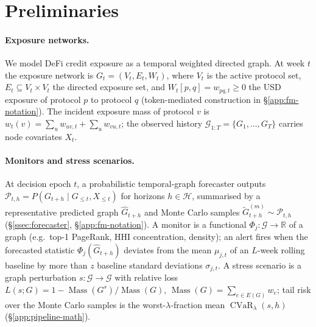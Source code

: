 \section{Preliminaries}
\label{sec:preliminaries}

\paragraph{Exposure networks.}
We model DeFi credit exposure as a temporal weighted directed
graph. At week $t$ the exposure network is $G_t=(V_t,E_t,W_t)$,
where $V_t$ is the active protocol set, $E_t\subseteq V_t\times
V_t$ the directed exposure set, and $W_t[p,q]=w_{pq,t}\geq 0$ the
USD exposure of protocol $p$ to protocol $q$ (token-mediated
construction in \S\ref{app:fm-notation}). The incident exposure
mass of protocol $v$ is
$w_t(v)=\sum_{u}w_{uv,t}+\sum_{u}w_{vu,t}$; the observed history
$\mathcal{G}_{1:T}=\{G_1,\ldots,G_T\}$ carries node covariates
$X_t$.

\paragraph{Monitors and stress scenarios.}
At decision epoch $t$, a probabilistic temporal-graph forecaster
outputs $\mathcal{P}_{t,h}=P(G_{t+h}\mid G_{\leq t},X_{\leq t})$
for horizons $h\in\mathcal{H}$, summarised by a representative
predicted graph $\widehat{G}_{t+h}$ and Monte Carlo samples
$\widetilde{G}_{t+h}^{(m)}\sim\mathcal{P}_{t,h}$
(\S\ref{ssec:forecaster}, \S\ref{app:fm-notation}). A monitor is
a functional $\Phi_j:\mathcal{G}\to\mathbb{R}$ of a graph (e.g.\
top-1 PageRank, HHI concentration, density); an alert fires when
the forecasted statistic $\Phi_j(\widehat{G}_{t+h})$ deviates
from the mean $\mu_{j,t}$ of an $L$-week rolling baseline by
more than $z$ baseline standard deviations $\sigma_{j,t}$. A stress scenario is a graph perturbation
$s:\mathcal{G}\to\mathcal{G}$ with relative loss
$L(s;G)=1-\operatorname{Mass}(G^s)/\operatorname{Mass}(G)$,
$\operatorname{Mass}(G)=\sum_{e\in E(G)}w_e$; tail risk over the
Monte Carlo samples is the worst-$\lambda$-fraction mean
$\operatorname{CVaR}_{\lambda}(s,h)$
(\S\ref{app:pipeline-math}).

